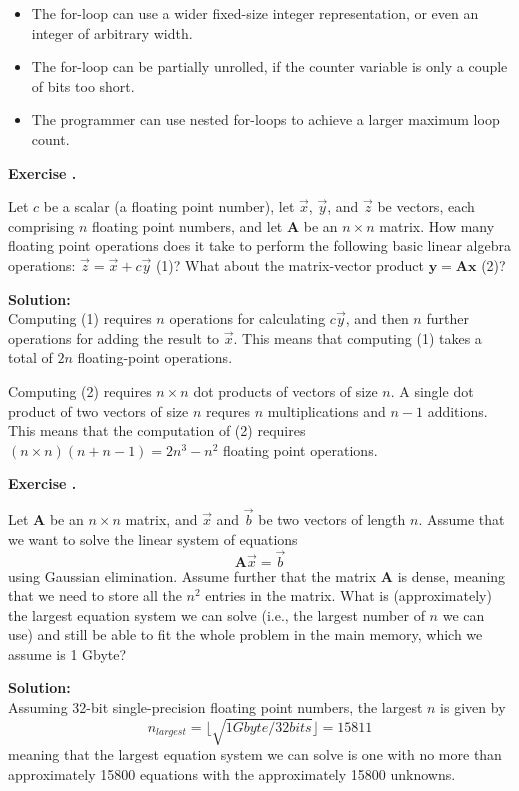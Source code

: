 \documentclass{scrartcl}
\newcounter{exercise}
\newcommand\exercise{
\stepcounter{exercise}
\textbf{Exercise \theexercise.}
}
\newcommand\solution{
\textbf{Solution:}
\\
}
\begin{document}
\begin{itemize}
\item{The for-loop can use a wider fixed-size integer representation, or even an integer of arbitrary width.}
\item{The for-loop can be partially unrolled, if the counter variable is only a couple of bits too short}.
\item{The programmer can use nested for-loops to achieve a larger maximum loop count.}
\end{itemize}

\exercise
Let $ c $ be a scalar (a floating point number), let $ \vec x $, $ \vec y $, and $ \vec z $ be vectors, each comprising $ n $ floating point numbers, and let $ \mathbf{A} $ be an $ n \times n $ matrix.
How many floating point operations does it take to perform the following basic linear algebra operations: $ \vec z = \vec x + c \vec y $ (1)?
What about the matrix-vector product $ \mathbf{y} = \mathbf{A} \mathbf{x} $ (2)?

\solution
Computing (1) requires $ n $ operations for calculating $ c \vec y $, and then $ n $ further operations for adding the result to $ \vec x $.
This means that computing (1) takes a total of $ 2n $ floating-point operations.

Computing (2) requires $ n \times n $ dot products of vectors of size $ n $.
A single dot product of two vectors of size $ n $ requres $ n $ multiplications and $ n - 1 $ additions.
This means that the computation of (2) requires $ (n \times n) (n + n - 1) = 2 n^3 - n^2 $ floating point operations.
\setcounter{equation}{2}

\exercise
Let $ \mathbf{A} $ be an $ n \times n $ matrix, and $ \vec x $ and $ \vec b $ be two vectors of length $ n $.
Assume that we want to solve the linear system of equations
\begin{equation}
\mathbf{A} \vec x = \vec b
\end{equation}
using Gaussian elimination.
Assume further that the matrix $ \mathbf{A} $ is dense, meaning that we need to store all the $ n^2 $ entries in the matrix.
What is (approximately) the largest equation system we can solve (i.e., the
largest number of $ n $ we can use) and still be able to fit the whole problem in the main memory, which we assume is 1 Gbyte?

\solution
Assuming 32-bit single-precision floating point numbers, the largest $ n $ is given by
$$ n_{largest} = \lfloor \sqrt{1 Gbyte / 32 bits} \rfloor = 15811 $$
meaning that the largest equation system we can solve is one with no more than approximately 15800 equations with the approximately 15800 unknowns.
\end{document}
